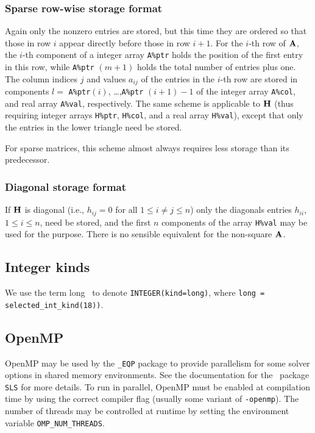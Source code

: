 \documentclass{galahad}
\newcommand{\packagename}{EQP}
\newcommand{\fullpackagename}{\libraryname\_\packagename}
\begin{document}
\subsubsection{Sparse row-wise storage format}\label{rowwise}
Again only the nonzero entries are stored, but this time
they are ordered so that those in row $i$ appear directly before those
in row $i+1$. For the $i$-th row of ${\mathbf{A}}$, the $i$-th component of a 
integer array {\tt A\%ptr} holds the position of the first entry in this row,
while {\tt A\%ptr} $(m+1)$ holds the total number of entries plus one.
The column indices $j$ and values $a_{ij}$ of the entries in the $i$-th row 
are stored in components 
$l =$ {\tt A\%ptr}$(i)$, \ldots ,{\tt A\%ptr} $(i+1)-1$ of the 
integer array {\tt A\%col}, and real array {\tt A\%val}, respectively. 
The same scheme is applicable to
${\mathbf{H}}$ (thus requiring integer arrays {\tt H\%ptr}, {\tt H\%col}, and 
a real array {\tt H\%val}),
except that only the entries in the lower triangle need be stored.

For sparse matrices, this scheme almost always requires less storage than 
its predecessor.

\subsubsection{Diagonal storage format}\label{diagonal}
If ${\mathbf{H}}$ is diagonal (i.e., $h_{ij} = 0$ for all $1 \leq i \neq j \leq n$)
only the diagonals entries $h_{ii}$, $1 \leq i \leq n$,  need be stored,
and the first $n$ components of the array {\tt H\%val} may be used for 
the purpose. There is no sensible equivalent for the non-square ${\mathbf{A}}$.


\subsection{Integer kinds}\label{Integer kinds}
We use the term
long \integer\ to denote {\tt INTEGER\-(kind=long)}, where 
{\tt long = selected\_int\_kind(18))}.


\subsection{OpenMP}
OpenMP may be used by the {\tt \fullpackagename} package to provide 
parallelism for some solver options in shared memory environments.  
See the documentation for the \galahad\ package {\tt SLS} for more details.
To run in parallel, OpenMP 
must be enabled at compilation time by using the correct compiler flag 
(usually some variant of {\tt -openmp}). 
The number of threads may be controlled at runtime
by setting the environment variable {\tt OMP\_NUM\_THREADS}.
\end{document}
